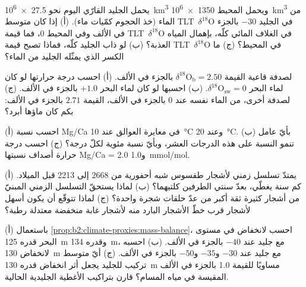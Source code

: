 \begin{exercise}[$\star$]\label{exo:b2:climate-proxies:1}
يحمل الجليد القارّي اليوم نحو \qty{27.5e6}{km^3} ويحمل المحيط \qty{1350e6}{km^3} من
الماء (خذ الحجوم كمّيات ماء). (أ) إذا كان متوسط \mbox{\textdir TLT $\delta^{18}$O} في الجليد $-30$ بالجزء في
الألف وفي المحيط 0، فما قيمة \mbox{\textdir TLT $\delta^{18}$O} في الغلاف المائي كلّه، بإهمال المياه
العذبة؟ (ب) لو ذاب الجليد كلّه، فماذا تصبح قيمة \mbox{\textdir TLT $\delta^{18}$O} في المحيط؟ (ج) ما
الكسر الذي يمثّله الجليد من الماء؟
\end{exercise}

\begin{exercise}[$\star$]\label{exo:b2:climate-proxies:2}
لصدفة قاعية القيمة $\delta^{18}\mathrm{O}_{\mathrm{b}} = 2.50$ بالجزء في الألف. (أ) احسب
درجة حرارتها لو كان لماء البحر $\delta^{18}\mathrm{O}_{\mathrm{sw}} = 0$. (ب) احسبها لو كان
لماء البحر $+1.0$ بالجزء في الألف. (ج) لصدفة أخرى، من الماء نفسه عند $0$ بالجزء في الألف، القيمة
$2.71$ بالجزء في الألف: بكم كان ماؤها أبرد؟
\end{exercise}

\begin{exercise}[$\star$]\label{exo:b2:climate-proxies:3}
(أ) احسب نسبة Mg/Ca في معايرة العوالق عند \qty{10}{\celsius} وعند
\qty{20}{\celsius}. (ب) بأيّ عامل تنمو النسبة على هذه الدرجات العشر، وبأيّ
نسبة مئوية لكلّ درجة؟ (ج) احسب درجة حرارة أصداف نسبتها Mg/Ca = 2.0
و\qty{1.0}{mmol/mol}.
\end{exercise}

\begin{exercise}[$\star$]\label{exo:b2:climate-proxies:4}
يمتدّ تسلسل زمني لأشجار طقسوس شبه أحفورية من 2668 إلى 2213 قبل الميلاد. (أ) كم سنة يغطّي،
بعدّ سنتي الطرفين كلتيهما؟ (ب) لماذا يستحقّ التسلسل الزمني المبنيّ من أشجار كثيرة ثقة أكبر من
عدّ حلقات شجرة واحدة؟ (ج) لماذا تتوقّع أن يكون  أسهل لأشجار
قرب خطّ الأشجار البارد منه لأشجار غابة منخفضة معتدلة رطبة؟
\end{exercise}

\begin{exercise}[$\star\star$]\label{exo:b2:climate-proxies:5}
(أ) باستعمال \cref{prop:b2:climate-proxies:mass-balance}، احسب  لانخفاض في مستوى البحر
قدره \qty{125}{m} وقدره \qty{134}{m}، مع جليد عند $-40$ بالجزء في الألف. (ب) احسبه لانخفاض
\qty{130}{m} مع جليد عند $-30$ و$-35$ و$-50$ بالجزء في الألف. (ج) أيّ متوسط تركيب للجليد
يجعل أثر انخفاض قدره \qty{130}{m} مساويًا للقيمة \num{1.0} بالجزء في الألف المقيسة في مياه
المسام؟ قارن بتراكيب الأغطية الجليدية الحالية.
\end{exercise}

